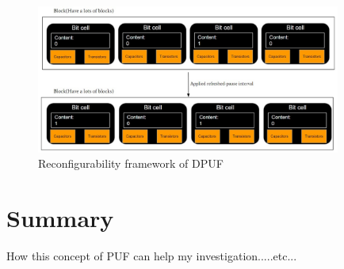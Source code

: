 \begin{figure}[htp]
    \centering
    \includegraphics[width=10cm]{figures/figure9.jpg}
    \caption{Reconfigurability framework of DPUF}
    \label{fig:figure9}
    \end{figure}

\section{Summary}

How this concept of PUF can help my investigation.....etc...
